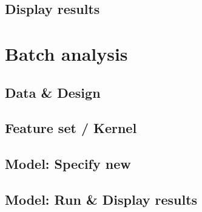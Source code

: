 \subsection{Display results}







\section{Batch analysis}


\subsection{Data \& Design}



\subsection{Feature set / Kernel}



\subsection{Model: Specify new}



\subsection{Model: Run \& Display results}




